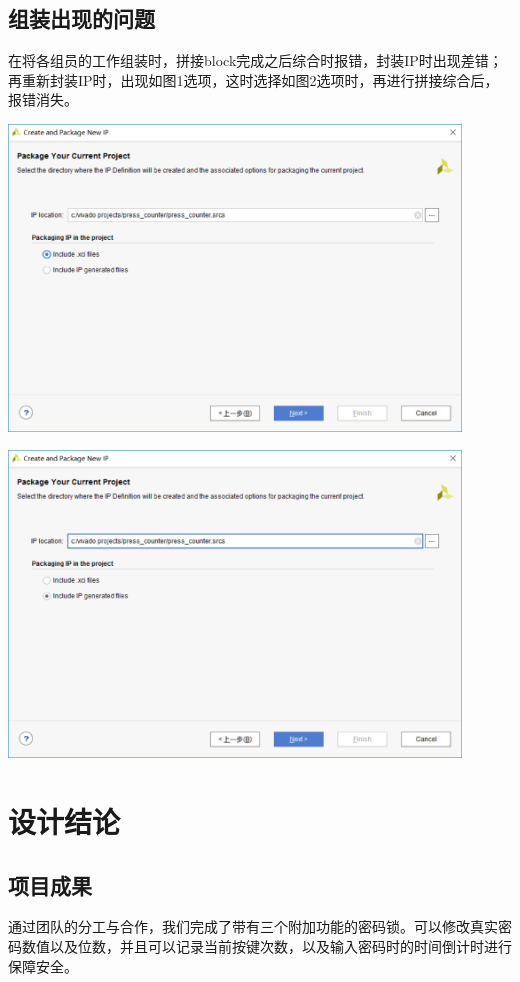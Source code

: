 \documentclass[a4paper,11pt]{ctexart}
\begin{document}
\subsection{组装出现的问题}

在将各组员的工作组装时，拼接block完成之后综合时报错，封装IP时出现差错；再重新封装IP时，出现如图1选项，这时选择如图2选项时，再进行拼接综合后，报错消失。

\includegraphics[width=0.9\textwidth]{./images/pic1.eps}

\includegraphics[width=0.9\textwidth]{./images/pic2.eps}

\section{设计结论}
\subsection{项目成果}
通过团队的分工与合作，我们完成了带有三个附加功能的密码锁。可以修改真实密码数值以及位数，并且可以记录当前按键次数，以及输入密码时的时间倒计时进行保障安全。
\end{document}
